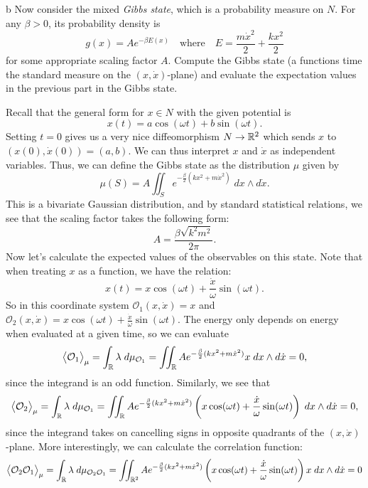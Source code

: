 \documentclass{pset}
\begin{document}
\begin{solution}
    \begin{part}{b}
        Now consider the mixed \emph{Gibbs state}, which is a probability measure on $N$. For any $\beta > 0$, its probability density is
        \[
            g(x) = A e^{-\beta E(x)}\quad\text{where}\quad E = \frac{m\dot{x}^2}{2} + \frac{kx^2}{2}
        \] 
        for some appropriate scaling factor $A$. Compute the Gibbs state (a functions time the standard measure on the $(x,\dot{x})$-plane) and evaluate the expectation values in the previous part in the Gibbs state.
    \end{part}
    \quad Recall that the general form for $x\in N$ with the given potential is 
    \[
        x(t)=a\cos(\omega t) + b\sin(\omega t)
    .\] 
    Setting $t=0$ gives us a very nice diffeomorphism $N \to \mathbb{R}^2$ which sends $x$ to $(x(0), \dot{x}(0))=(a,b)$. We can thus interpret $x$ and $\dot{x}$ as independent variables. Thus, we can define the Gibbs state as the distribution $\mu$ given by
    \[
        \mu(S) = A\iint_S e^{-\frac{\beta}{2} \left(kx^2 + m\dot{x}^2\right)}\;dx\wedge d\dot{x}
    .\] 
    This is a bivariate Gaussian distribution, and by standard statistical relations, we see that the scaling factor takes the following form:
    \[
        A = \frac{\beta\sqrt{k^2m^2}}{2\pi}
    .\]
    Now let's calculate the expected values of the observables on this state. Note that when treating $x$ as a function, we have the relation:
    \[
        x(t) = x\cos(\omega t) + \frac{\dot{x}}{\omega}\sin(\omega t)
    .\] 
    So in this coordinate system $\mathcal{O}_1(x,\dot{x})=x$ and $\mathcal{O}_2(x,\dot{x})=x\cos(\omega t) + \frac{\dot{x}}{\omega}\sin(\omega t)$. The energy only depends on energy when evaluated at a given time, so we can evaluate
    \[
        \big\langle \mathcal{O}_1 \big\rangle_\mu = \int_{\mathbb{R}}\lambda\; d\mu_{\mathcal{O}_1} = \iint_{\mathbb{R}} Ae^{-\frac{\beta}{2}(kx^2+m\dot{x}^2)} x\;dx\wedge d\dot{x}=0,
    \] 
    since the integrand is an odd function. Similarly, we see that
    \[
        \big\langle \mathcal{O}_2 \big\rangle_\mu = \int_{\mathbb{R}}\lambda\; d\mu_{\mathcal{O}_1} = \iint_{\mathbb{R}} Ae^{-\frac{\beta}{2}(kx^2+m\dot{x}^2)} \left(x\cos(\omega t) + \frac{\dot{x}}{\omega}\sin(\omega t)\right)\;dx\wedge d\dot{x}=0,
    \]
    since the integrand takes on cancelling signs in opposite quadrants of the $(x,\dot{x})$-plane. More interestingly, we can calculate the correlation function:
    \[
        \begin{aligned}
            \big\langle \mathcal{O}_2 \mathcal{O}_1 \big\rangle_\mu = \int_{\R}\lambda\; d\mu_{\mathcal{O}_2 \mathcal{O}_1} &= \iint_{\R^2} Ae^{-\frac{\beta}{2}(kx^2+m\dot{x}^2)} \left(x\cos(\omega t) + \frac{\dot{x}}{\omega}\sin(\omega t)\right)x\;dx\wedge d\dot{x}=0\\

\end{aligned}\]
\end{solution}
\end{document}
